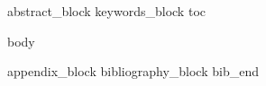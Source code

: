 \documentclass[11pt]{article}
\begin{document}
\maketitle
\ifdefined\affiliationblock\affiliationblock\fi

{{abstract_block}}
{{keywords_block}}
{{toc}}

{{body}}

{{appendix_block}}
{{bibliography_block}}
{{bib_end}}
\end{document}
